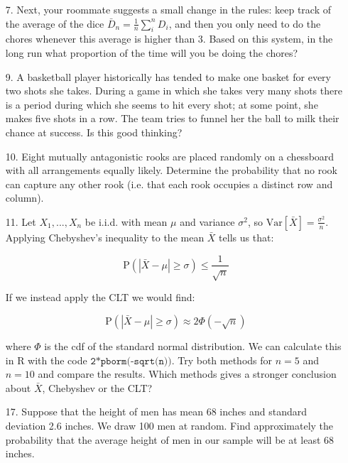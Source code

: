 \documentclass[10pt]{extarticle}
\newcommand{\Var}{\text{Var}}
\renewcommand{\P}{\text{P}}
\begin{document}
\begin{itemize}
	\item[7.] Next, your roommate suggests a small change in the rules: keep track of the average of the dice $\bar D_n = \frac 1n \sum_i^n D_i$, and then you only need to do the chores whenever this average is higher than 3. Based on this system, in the long run what proportion  of the time will you be doing the chores? \\ 

	\item[9.] A basketball player historically has tended to make one basket for every two shots she takes. During a game in which she takes very many shots there is a period during which she seems to hit every shot; at some point, she makes five shots in a row. The team tries to funnel her the ball to milk their chance at success. Is this good thinking? \\ 

	\item[10.] Eight mutually antagonistic rooks are placed randomly on a chessboard with all arrangements equally likely. Determine the probability that no rook can capture any other rook (i.e. that each rook occupies a distinct row and column). \\ 

	\item[11.] Let $X_1, ..., X_n$ be i.i.d. with mean $\mu$ and variance $\sigma^2$, so $\Var[\bar X] = \frac{\sigma^2}{n}$. Applying Chebyshev's inequality to the mean $\bar X$ tells us that:

$$\P(|\bar X - \mu | \geq \sigma) \leq \frac{1}{\sqrt n}$$

	\item[ ] If we instead apply the CLT we would find:
 
$$\P(| \bar X - \mu | \geq \sigma) \approx 2\Phi (-\sqrt n)$$

	\item[ ] where $\Phi$ is the cdf of the standard normal distribution. We can calculate this in R with the code $\texttt{2*pborm(-sqrt(n))}$. Try both methods for $n=5$ and $n=10$ and compare the results. Which methods gives a stronger conclusion about $\bar X$, Chebyshev or the CLT? \\

	\item[17.] Suppose that the height of men has mean 68 inches and standard deviation 2.6 inches. We draw 100 men at random. Find approximately the probability that the average height of men in our sample will be at least 68 inches. \\  


\end{itemize}
\end{document}
